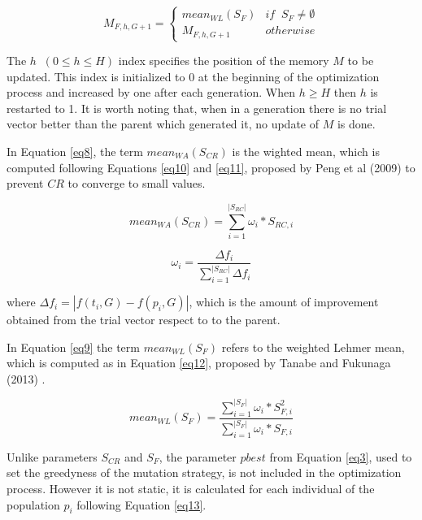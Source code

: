 \documentclass[review]{elsarticle}
\begin{document}
\begin{equation}
M_{F,h,G+1} = \left\{ \begin{array}{lc}
mean_{WL} (S_{F}) &   if \;\; S_{F} \neq \emptyset \\
M_{F,h,G+1} &  otherwise
\end{array}
\right.
\label{eq9}
\end{equation}

The $h \;\; (0 \le h \le H)$ index specifies the position of the memory $M$ to be updated. This index is initialized to $0$ at the beginning of the optimization process and increased by one after each generation. When $h \ge H$ then $h$ is restarted to 1. It is worth noting that, when in a generation there is no trial vector better than the parent which generated it, no update of $M$ is done.

In Equation \ref{eq8}, the term $mean_{WA} (S_{CR})$ is the wighted mean,  which is computed following Equations \eqref{eq10} and \eqref{eq11}, proposed by Peng et al (2009) \cite{peng2009multi} to prevent $CR$ to converge to small values.

\begin{equation}
mean_{WA} (S_{CR}) = \sum_{i = 1}^{|S_{RC}|} \omega_i * S_{RC,i}
\label{eq10}
\end{equation}

\begin{equation}
\omega_i = \frac{\Delta f_i}{\sum_{i = 1}^{|S_{RC}|} \Delta f_i}
\label{eq11}
\end{equation}

where $\Delta f_i = |f(t_i,G) - f(p_i, G)|$, which is the amount of improvement obtained from the trial vector respect to to the parent.

In Equation \ref{eq9} the term $mean_{WL} (S_{F})$ refers to the weighted Lehmer mean, which is computed as in Equation \eqref{eq12}, proposed by Tanabe and Fukunaga (2013) \cite{tanabe2013success}.

\begin{equation}
mean_{WL} (S_{F}) = \frac{\sum_{i = 1}^{|S_{F}|} \omega_i * S^2_{F,i}}{\sum_{i = 1}^{|S_{F}|} \omega_i * S_{F,i}}
\label{eq12}
\end{equation}

Unlike parameters $S_{CR}$ and $S_F$, the parameter $pbest$ from Equation \eqref{eq3}, used to set the greedyness of the mutation strategy, is not included in the optimization process. However it is not static, it is calculated for each individual of the population $p_i$ following Equation \eqref{eq13}.
\end{document}
